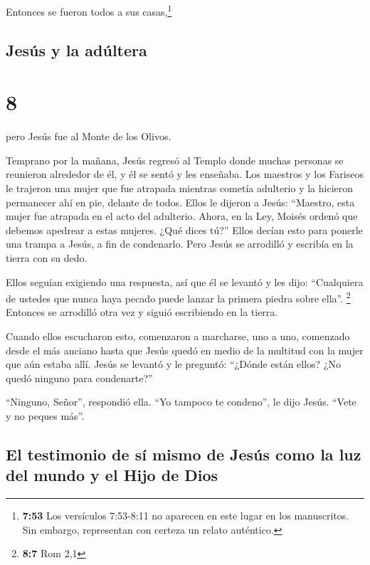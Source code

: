  Entonces se fueron todos a sus casas,\footnote{\textbf{7:53}
  Los versículos 7:53-8:11 no aparecen en este lugar en los manuscritos.
  Sin embargo, representan con certeza un relato auténtico.}

\hypertarget{jesuxfas-y-la-aduxfaltera}{%
\subsection{Jesús y la adúltera}\label{jesuxfas-y-la-aduxfaltera}}

\hypertarget{section-7}{%
\section{8}\label{section-7}}

 pero Jesús fue al Monte de los Olivos.

 Temprano por la mañana, Jesús regresó al Templo donde
muchas personas se reunieron alrededor de él, y él se sentó y les
enseñaba.  Los maestros y los Fariseos le trajeron una
mujer que fue atrapada mientras cometía adulterio y la hicieron
permanecer ahí en pie, delante de todos.  Ellos le dijeron
a Jesús: ``Maestro, esta mujer fue atrapada en el acto del adulterio.
 Ahora, en la Ley, Moisés ordenó que debemos apedrear a
estas mujeres. ¿Qué dices tú?''  Ellos decían esto para
ponerle una trampa a Jesús, a fin de condenarlo. Pero Jesús se arrodilló
y escribía en la tierra con su dedo.

 Ellos seguían exigiendo una respuesta, así que él se
levantó y les dijo: ``Cualquiera de ustedes que nunca haya pecado puede
lanzar la primera piedra sobre ella''. \footnote{\textbf{8:7} Rom 2,1}
 Entonces se arrodilló otra vez y siguió escribiendo en la
tierra.

 Cuando ellos escucharon esto, comenzaron a marcharse, uno
a uno, comenzado desde el más anciano hasta que Jesús quedó en medio de
la multitud con la mujer que aún estaba allí.  Jesús se
levantó y le preguntó: ``¿Dónde están ellos? ¿No quedó ninguno para
condenarte?''

 ``Ninguno, Señor'', respondió ella. ``Yo tampoco te
condeno'', le dijo Jesús. ``Vete y no peques más''.

\hypertarget{el-testimonio-de-suxed-mismo-de-jesuxfas-como-la-luz-del-mundo-y-el-hijo-de-dios}{%
\subsection{El testimonio de sí mismo de Jesús como la luz del mundo y
el Hijo de
Dios}\label{el-testimonio-de-suxed-mismo-de-jesuxfas-como-la-luz-del-mundo-y-el-hijo-de-dios}}

